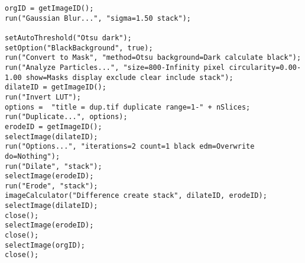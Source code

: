 \begin{lstlisting}
orgID = getImageID();
run("Gaussian Blur...", "sigma=1.50 stack");

setAutoThreshold("Otsu dark");
setOption("BlackBackground", true);
run("Convert to Mask", "method=Otsu background=Dark calculate black");
run("Analyze Particles...", "size=800-Infinity pixel circularity=0.00-1.00 show=Masks display exclude clear include stack");
dilateID = getImageID();
run("Invert LUT");
options =  "title = dup.tif duplicate range=1-" + nSlices;
run("Duplicate...", options);
erodeID = getImageID();
selectImage(dilateID);
run("Options...", "iterations=2 count=1 black edm=Overwrite do=Nothing");
run("Dilate", "stack");
selectImage(erodeID);
run("Erode", "stack");
imageCalculator("Difference create stack", dilateID, erodeID);
selectImage(dilateID);
close();
selectImage(erodeID);
close();
selectImage(orgID);
close();



\end{lstlisting}
